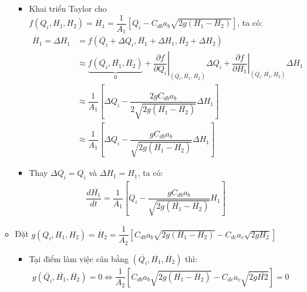 \begin{enumerate}[\it a.]
\begin{itemize}
\begin{itemize}
                        \item Khai triển Taylor cho $f\left({Q_i, H_1, H_2}\right) = \dot{H_1} = \dfrac{1}{A_1} \left[{Q_i - C_{db}a_b\sqrt{2g(H_1 - H_2)}}\right]$, ta có:
                            \begin{align}
                                \dot{H_1} = \Delta H_1 & = f\left({\overline{Q_i} + \Delta Q_i, \overline{H_1} + \Delta H_1, \overline{H_2} + \Delta H_2}\right) \\
                                & \approx \underbrace{f\left({\overline{Q_i}, \overline{H_1}, \overline{H_2}}\right)}_{0} + \left.\dfrac{\partial f}{\partial Q_i}\right|_{\left({\overline{Q_i}, \overline{H_1}, \overline{H_2}}\right)} \Delta Q_i + \left.\dfrac{\partial f}{\partial H_1}\right|_{\left({\overline{Q_i}, \overline{H_1}, \overline{H_2}}\right)} \Delta H_1\\
                                & \approx \dfrac{1}{A_1} \left[{\Delta Q_i - \dfrac{2gC_{db}a_b}{2\sqrt{2g(\overline{H_1} - \overline{H_2})}} \Delta H_1}\right]\\
                                & \approx \dfrac{1}{A_1} \left[{\Delta Q_i - \dfrac{gC_{db}a_b}{\sqrt{2g(\overline{H_1} - \overline{H_2})}} \Delta H_1}\right]
                            \end{align}

                        \item Thay $\Delta Q_i = Q_i$ và $\Delta H_1 = H_1$, ta có:
                            \begin{align}
                                \dfrac{dH_1}{dt} = \dfrac{1}{A_1} \left[{Q_i - \dfrac{gC_{db}a_b}{\sqrt{2g(\overline{H_1} - \overline{H_2})}} H_1}\right]
                            \end{align}
                    \end{itemize}

                \item Đặt $g\left({Q_i, H_1, H_2}\right) = \dot{H_2} = \dfrac{1}{A_2} \left[{C_{db}a_b\sqrt{2g(H_1 - H_2)} - C_{dc}a_c\sqrt{2gH_2}}\right]$
                    \begin{itemize}
                        \item Tại điểm làm việc cân bằng $\left({\overline{Q_i}, \overline{H_1}, \overline{H_2}}\right)$ thì:
                            \begin{align}
                                g\left({\overline{Q_i}, \overline{H_1}, \overline{H_2}}\right) = 0 \Longleftrightarrow \dfrac{1}{A_2} \left[{C_{db}a_b\sqrt{2g(\overline{H_1} - \overline{H_2})} - C_{dc}a_c\sqrt{2g \overline{H2}}}\right] = 0
                            \end{align}


\end{itemize}
\end{itemize}
\end{enumerate}
